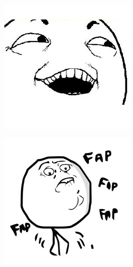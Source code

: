 \begin{multicols}{8}
\begin{center}
\includegraphics[width=\linewidth]{./IMG-GIT/MEMES/Meme-Faces-13.jpg}  
\end{center}

\begin{center}
\includegraphics[width=\linewidth]{./IMG-GIT/MEMES/Meme-Faces-22.jpg}  
\end{center}


\end{multicols}
